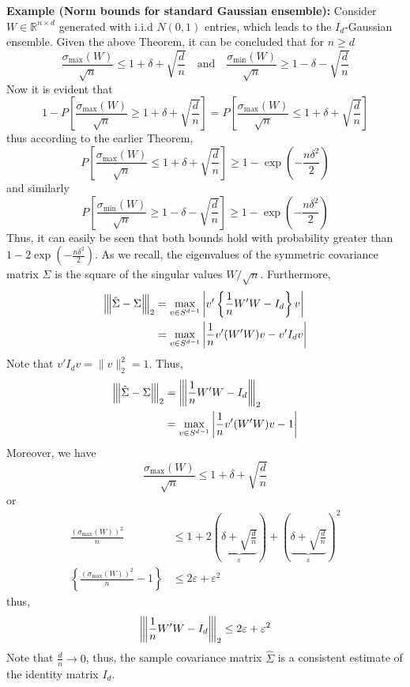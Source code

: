 \documentclass[10pt,handout,english]{beamer}
\newcommand{\R}{\mathbb{R}}
\newcommand{\vertiii}[1]{{\left\vert\kern-0.25ex\left\vert\kern-0.25ex\left\vert #1 
    \right\vert\kern-0.25ex\right\vert\kern-0.25ex\right\vert}}
\begin{document}
\begin{frame}[allowframebreaks]
\textbf{Example (Norm bounds for standard Gaussian ensemble):} 
Consider $W\in\R^{n\times d}$ generated with i.i.d $N(0,1)$ entries, which leads to the $I_d$-Gaussian ensemble. Given the above Theorem, it can be concluded that for $n\geq d$
\[
\frac{\sigma_{\max}(W)}{\sqrt{n}}\leq 1+\delta+\sqrt{\frac{d}{n}}\quad\text{and}\quad \frac{\sigma_{\min}(W)}{\sqrt{n}}\geq 1-\delta-\sqrt{\frac{d}{n}}
\]
Now it is evident that
\[
1-P\left[\frac{\sigma_{\max}(W)}{\sqrt{n}}\geq 1+\delta+\sqrt{\frac{d}{n}}\right]=
P\left[\frac{\sigma_{\max}(W)}{\sqrt{n}}\leq 1+\delta+\sqrt{\frac{d}{n}}\right]
\]
thus according to the earlier Theorem,
 \[
P\left[\frac{\sigma_{\max}(W)}{\sqrt{n}}\leq 1+\delta+\sqrt{\frac{d}{n}}\right]\geq1- \exp{\left(-\frac{n\delta^2}{2}\right)}
\]
and similarly
 \[
P\left[\frac{\sigma_{\min}(W)}{\sqrt{n}}\geq 1-\delta-\sqrt{\frac{d}{n}}\right]\geq 1-\exp{\left(-\frac{n\delta^2}{2}\right)}
\]
Thus, it can easily be seen that both bounds hold with probability greater than $1-2\exp\left(-\frac{n\delta^2}{2}\right)$. As we recall, the eigenvalues of the symmetric covariance matrix $\hat{\Sigma}$ is the square of the singular values $W/\sqrt{n}$. Furthermore,
\begin{align*}
\vertiii{\hat{\Sigma}-\Sigma}_2&=\max_{v\in S^{d-1}}\left\lvert v'\left\{\frac{1}{n}W'W-I_d\right\}v\right\rvert\\
&=\max_{v\in S^{d-1}}\left\lvert \frac{1}{n}v'(W'W)v-v'I_dv\right\rvert
\end{align*}
Note that $v'I_dv=\lVert v\rVert_2^2=1$. Thus,
\begin{align*}
\vertiii{\hat{\Sigma}-\Sigma}_2&=\vertiii{\frac{1}{n}W'W-I_d}_2\\
&=\max_{v\in S^{d-1}}\left\lvert \frac{1}{n}v'(W'W)v-1\right\rvert
\end{align*}
Moreover, we have
\[
\frac{\sigma_{\max}(W)}{\sqrt{n}}\leq 1+\delta+\sqrt{\frac{d}{n}}
\]
or
\begin{align*}
\frac{(\sigma_{\max}(W))^2}{n}&\leq1+2\left(\underbrace{\delta+\sqrt{\frac{d}{n}}}_{\varepsilon}\right)+ \left(\underbrace{\delta+\sqrt{\frac{d}{n}}}_{\varepsilon}\right)^2\\
\left\{\frac{(\sigma_{\max}(W))^2}{n}-1\right\}&\leq2\varepsilon+ \varepsilon^2
\end{align*}
thus,
\[
\vertiii{\frac{1}{n}W'W-I_d}_2\leq 2\varepsilon+\varepsilon^2
\]
Note that $\frac{d}{n}\to 0$, thus, the sample covariance matrix $\hat{\Sigma}$ is a consistent estimate of the identity matrix $I_d$.


\end{frame}
\end{document}
